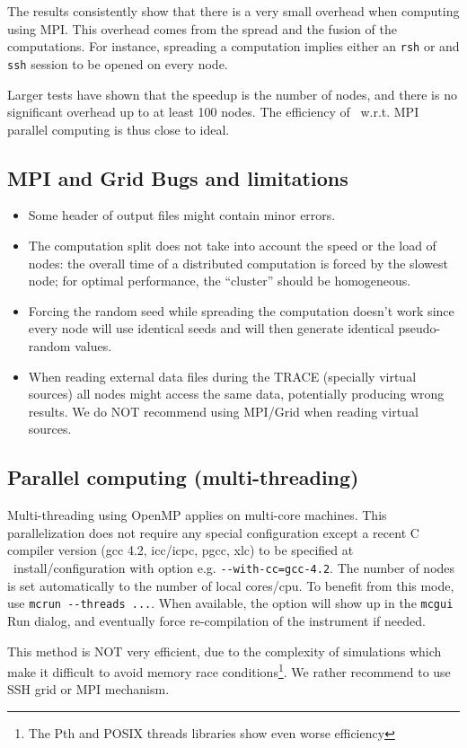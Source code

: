 The results consistently show that there is a very small overhead
when computing using MPI. This overhead comes from the spread and the
fusion of the computations. For instance, spreading a computation
implies either an \verb'rsh' or and \verb'ssh' session to be opened on
every node.

Larger tests have shown that the speedup is the number of nodes, 
and there is no significant overhead up to at least 100 nodes. The efficiency 
of \MCS\ w.r.t. MPI parallel computing is thus close to ideal.

\subsection{MPI and Grid Bugs and limitations}

\begin{itemize}
\item Some header of output files might contain minor errors.
\item The computation split does not take into account the speed or the
  load of nodes: the overall time of a distributed computation is
  forced by the slowest node; for optimal performance, the ``cluster''
  should be homogeneous.
\item Forcing the random seed while spreading the computation doesn't
  work since every node will use identical seeds and will then
  generate identical pseudo-random values.
\item When reading external data files during the TRACE (specially virtual sources) 
  all nodes might access the same data, potentially producing wrong results. We do 
  NOT recommend using MPI/Grid when reading virtual sources.
\end{itemize}

\subsection{Parallel computing (multi-threading)}
\label{s:openmp}
Multi-threading using OpenMP applies on multi-core machines. This parallelization does not require any 
special configuration except a recent C compiler version (gcc 4.2, icc/icpc, pgcc, xlc) to be 
specified at \MCS\ install/configuration with option e.g. \verb+--with-cc=gcc-4.2+. 
The number of nodes is set automatically to the number of local cores/cpu. To benefit from this mode, 
use \verb+mcrun --threads ...+. When available, the option will show up 
in the \verb+mcgui+ Run dialog, and eventually force re-compilation of the instrument if needed. 

This method is NOT very efficient, due to the complexity of simulations which make it difficult to avoid memory race conditions\footnote{The Pth and POSIX threads libraries show even worse efficiency}. We rather recommend to use SSH grid or MPI mechanism. 

